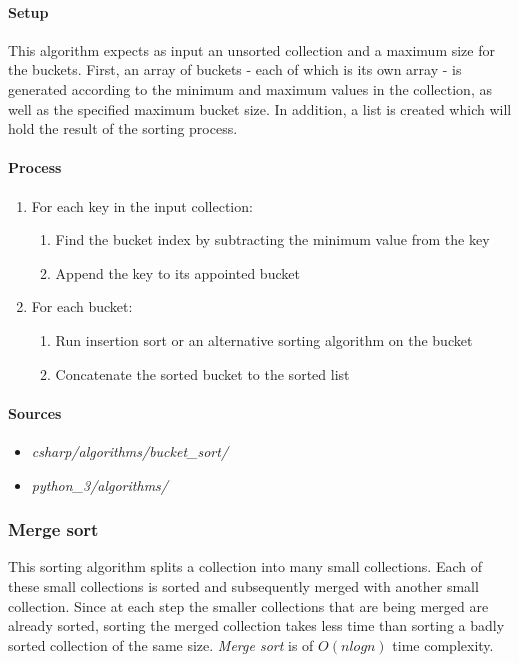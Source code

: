 \documentclass{article}
\begin{document}
{\paragraph{Setup}
This algorithm expects as input an unsorted collection and a maximum size for the buckets. First, an array of
buckets - each of which is its own array - is generated according to the minimum and maximum values in the
collection, as well as the specified maximum bucket size. In addition, a list is created which will hold the
result of the sorting process.

\paragraph{Process}
\begin{enumerate}
\item{For each key in the input collection:}
  \begin{enumerate}
  \item{Find the bucket index by subtracting the minimum value from the key}
  \item{Append the key to its appointed bucket}
  \end{enumerate}
\item{For each bucket:}
  \begin{enumerate}
  \item{Run insertion sort or an alternative sorting algorithm on the bucket}
  \item{Concatenate the sorted bucket to the sorted list}
  \end{enumerate}
\end{enumerate}

\begin{samepage}
  \paragraph{Sources}
  \begin{itemize}
  \item{{\em csharp/algorithms/bucket\_sort/}}
  \item{{\em python\_3/algorithms/}}
  \end{itemize}
\end{samepage}


\subsubsection{Merge sort}
This sorting algorithm splits a collection into many small collections. Each of these small collections is sorted and
subsequently merged with another small collection. Since at each step the smaller collections that are being merged
are already sorted, sorting the merged collection takes less time than sorting a badly sorted collection of the same
size. {\em Merge sort} is of \(O(n log n)\) time complexity.

}
\end{document}
